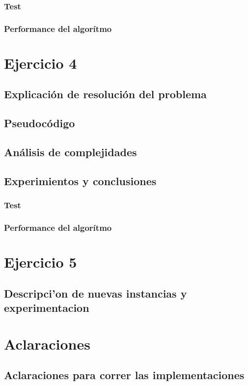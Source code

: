 \documentclass[12pt, a4paper]{article}
\begin{document}
\subsubsection[2.5]{Test}
%
\subsubsection[2.5]{Performance del algorítmo}
%

\newpage
\section{Ejercicio 4} 
\subsection{Explicaci\'on de resoluci\'on del problema}

\subsection{Pseudoc\'odigo}

\subsection{An\'alisis de complejidades}

%
%
\subsection{Experimientos y conclusiones}
\subsubsection[2.5]{Test}
%
\subsubsection[2.5]{Performance del algorítmo}
%

\newpage
\section{Ejercicio 5} 
\subsection{Descripci'on de nuevas instancias y experimentacion}



\newpage
\section{Aclaraciones} 
\subsection{Aclaraciones para correr las implementaciones}

\end{document}
